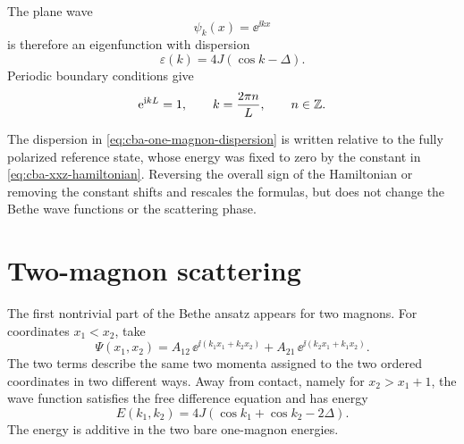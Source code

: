 The plane wave
\begin{equation}
\label{eq:cba-one-magnon-plane-wave}
    \psi_k(x)=\ee^{\ii kx}
\end{equation}
is therefore an eigenfunction with dispersion
\begin{equation}
\label{eq:cba-one-magnon-dispersion}
    \varepsilon(k)
    =
    4J(\cos k-\Delta).
\end{equation}
Periodic boundary conditions give
\begin{equation}
\label{eq:cba-one-magnon-momentum-quantization}
    \mathrm{e}^{\mathrm{i} kL}=1,
    \qquad
    k=\frac{2\pi n}{L},
    \qquad
    n\in\mathbb{Z} .
\end{equation}

\begin{remark}
The dispersion in \cref{eq:cba-one-magnon-dispersion} is written relative to the
fully polarized reference state, whose energy was fixed to zero by the constant
in \cref{eq:cba-xxz-hamiltonian}.  Reversing the overall sign of the Hamiltonian
or removing the constant shifts and rescales the formulas, but does not change
the Bethe wave functions or the scattering phase.
\end{remark}

\section{Two-magnon scattering}
\label{sec:cba-two-magnon-scattering}

The first nontrivial part of the Bethe ansatz appears for two magnons.  For
coordinates $x_1<x_2$, take
\begin{equation}
\label{eq:cba-two-magnon-wavefunction}
    \Psi(x_1,x_2)
    =
    A_{12}\,\ee^{\ii(k_1x_1+k_2x_2)}
    +
    A_{21}\,\ee^{\ii(k_2x_1+k_1x_2)} .
\end{equation}
The two terms describe the same two momenta assigned to the two ordered
coordinates in two different ways.  Away from contact, namely for
$x_2>x_1+1$, the wave function satisfies the free difference equation and has
energy
\begin{equation}
\label{eq:cba-two-magnon-energy}
    E(k_1,k_2)
    =
    4J(\cos k_1+\cos k_2-2\Delta).
\end{equation}
The energy is additive in the two bare one-magnon energies.


